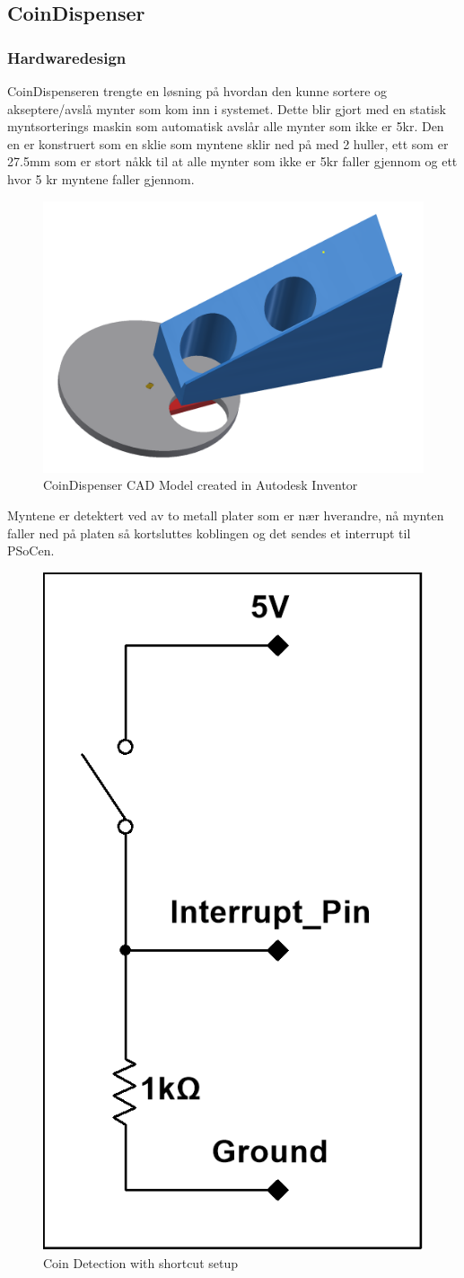 \documentclass[Rapport/BallDispenser/BallDispenser.tex]{subfiles}
\begin{document}
\subsection{CoinDispenser}
\subsubsection{Hardwaredesign}
CoinDispenseren trengte en løsning på hvordan den kunne sortere og akseptere/avslå mynter som kom inn i systemet. Dette blir gjort med en statisk myntsorterings maskin som automatisk avslår alle mynter som ikke er 5kr. Den en er konstruert som en sklie som myntene sklir ned på med 2 huller, ett som er 27.5mm som er stort nåkk til at alle mynter som ikke er 5kr faller gjennom og ett hvor 5 kr myntene faller gjennom.

\begin{figure}[H]
    \centering
    \includegraphics[width=\linewidth]{Rapport/BallDispenser/CoinDispenser/graphics/coinmaster.png}
    \caption{CoinDispenser CAD Model created in Autodesk Inventor}
    \label{fig:CoinCAD}
\end{figure}

Myntene er detektert ved av to metall plater som er nær hverandre, nå mynten faller ned på platen så kortsluttes koblingen og det sendes et interrupt til PSoCen.

\begin{figure}[H]
    \centering
    \includegraphics[width=0.3\linewidth]{Rapport/BallDispenser/CoinDispenser/graphics/CoinDispInterrupt.png}
    \caption{Coin Detection with shortcut setup}
    \label{fig:my_label}
\end{figure}
\end{document}
